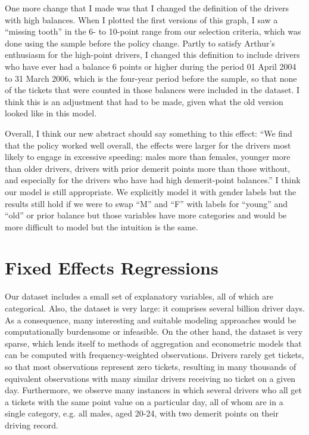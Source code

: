 \documentclass[12pt]{paper}
\begin{document}
One more change that I made was that I changed the definition of the drivers with high balances. 
When I plotted the first versions of this graph, I saw a ``missing tooth'' in the 6- to 10-point range from our selection criteria, which was done using the sample before the policy change. 
Partly to satisfy Arthur's enthusiasm for the high-point drivers, I changed this definition to include drivers who have ever had a balance 6 points or higher during the period 01 April 2004 to 31 March 2006, which is the four-year period before the sample,  so that none of the tickets that were counted in those balances were included in the dataset. 
I think this is an adjustment that had to be made, given what the old version looked like in this model. 

Overall, I think our new abstract should say something to this effect: 
``We find that the policy worked well overall, the effects were larger for the drivers most likely to engage in excessive speeding: males more than females, younger more than older drivers, drivers with prior demerit points more than those without, and especially for the drivers who have had high demerit-point balances.'' 
I think our model is still appropriate. We explicitly model it with gender labels but the results still hold if we were to swap ``M'' and ``F'' with labels for ``young'' and ``old'' or prior balance
but those variables have more categories and would be more difficult to model but the intuition is the same. 


\section*{Fixed Effects Regressions}

Our dataset includes a small set of explanatory variables, all of which are categorical. 
Also, the dataset is very large: it comprises several billion driver days. 
As a consequence, many interesting and suitable modeling approaches would be computationally burdensome or infeasible. 
On the other hand, the dataset is very sparse, which lends itself to methods of aggregation and
econometric models that can be computed with frequency-weighted observations.
Drivers rarely get tickets, so that most observations represent zero tickets, 
resulting in many thousands of equivalent observations with many similar drivers 
receiving no ticket on a given day. 
Furthermore, we observe many instances in which several drivers
who all get a tickets with the same point value on a particular day, 
all of whom are in a single category, 
e.g. all males, aged 20-24, with two demerit points on their driving record. 
\end{document}
